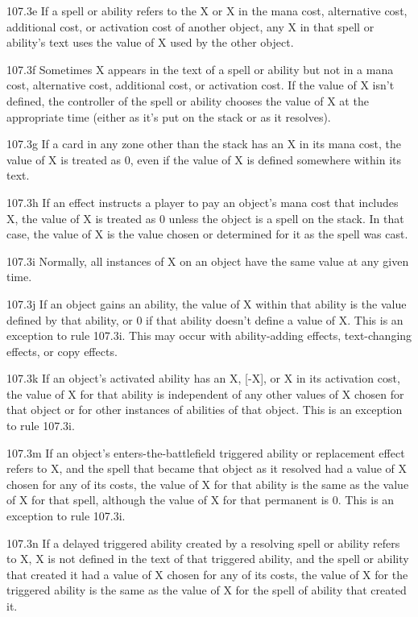 107.3e If a spell or ability refers to the {X} or X in the mana cost, alternative cost, additional cost, or activation cost of another object, any X in that spell or ability’s text uses the value of X used by the other object.

107.3f Sometimes X appears in the text of a spell or ability but not in a mana cost, alternative cost, additional cost, or activation cost. If the value of X isn’t defined, the controller of the spell or ability chooses the value of X at the appropriate time (either as it’s put on the stack or as it resolves).

107.3g If a card in any zone other than the stack has an {X} in its mana cost, the value of {X} is treated as 0, even if the value of X is defined somewhere within its text.

107.3h If an effect instructs a player to pay an object’s mana cost that includes {X}, the value of X is treated as 0 unless the object is a spell on the stack. In that case, the value of X is the value chosen or determined for it as the spell was cast.

107.3i Normally, all instances of X on an object have the same value at any given time.

107.3j If an object gains an ability, the value of X within that ability is the value defined by that ability, or 0 if that ability doesn’t define a value of X. This is an exception to rule 107.3i. This may occur with ability-adding effects, text-changing effects, or copy effects.

107.3k If an object’s activated ability has an {X}, [-X], or X in its activation cost, the value of X for that ability is independent of any other values of X chosen for that object or for other instances of abilities of that object. This is an exception to rule 107.3i.

107.3m If an object’s enters-the-battlefield triggered ability or replacement effect refers to X, and the spell that became that object as it resolved had a value of X chosen for any of its costs, the value of X for that ability is the same as the value of X for that spell, although the value of X for that permanent is 0. This is an exception to rule 107.3i.

107.3n If a delayed triggered ability created by a resolving spell or ability refers to X, X is not defined in the text of that triggered ability, and the spell or ability that created it had a value of X chosen for any of its costs, the value of X for the triggered ability is the same as the value of X for the spell of ability that created it.

